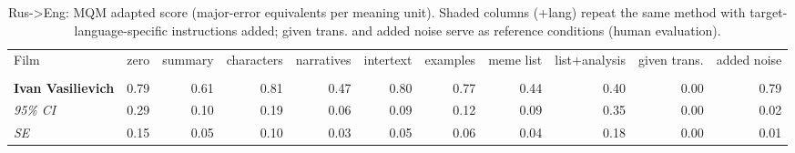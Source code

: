 \begin{table}[ht]
\centering
\begin{adjustbox}{width=\textwidth}
\begin{tabular}{lrrrrrrrr|rr}
Film & zero & summary & characters & narratives & intertext & examples & meme list & list+analysis & \multicolumn{1}{|r}{given trans.} & added noise \\
 &  &  &  &  &  &  &  &  &  &  \\
\hline
\textbf{Ivan Vasilievich} & 0.79 & 0.61 & 0.81 & 0.47 & 0.80 & 0.77 & 0.44 & 0.40 & 0.00 & 0.79 \\

\emph{95\% CI} & 0.29 & 0.10 & 0.19 & 0.06 & 0.09 & 0.12 & 0.09 & 0.35 & 0.00 & 0.02 \\

\emph{SE} & 0.15 & 0.05 & 0.10 & 0.03 & 0.05 & 0.06 & 0.04 & 0.18 & 0.00 & 0.01 \\

\hline
\end{tabular}
\end{adjustbox}
\caption{Rus->Eng: MQM adapted score (major-error equivalents per meaning unit). Shaded columns (+lang) repeat the same method with target-language-specific instructions added; given trans. and added noise serve as reference conditions (human evaluation).}
\label{tab:mqm-ivan-vas-eng-human}
\end{table}
